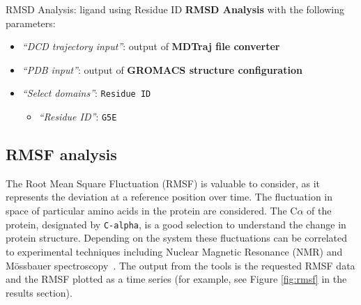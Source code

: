\documentclass[twocolumn]{bmcart}%
\providecommand{\tightlist}{%
  \setlength{\itemsep}{0pt}\setlength{\parskip}{0pt}}
\begin{document}

\begin{handson_box_colour}{RMSD Analysis: ligand using Residue ID}
  \textbf{RMSD Analysis} with the following parameters:

  \begin{itemize}
  \tightlist
  \item
    \emph{``DCD trajectory input''}: output of
    \textbf{MDTraj file converter}
  \item
    \emph{``PDB input''}:
    output of \textbf{GROMACS
    structure configuration}
  \item
    \emph{``Select domains''}: \texttt{Residue\ ID}

    \begin{itemize}
    \tightlist
    \item
      \emph{``Residue ID''}: \texttt{G5E}
    \end{itemize}
  \end{itemize}



\end{handson_box_colour}



\hypertarget{rmsf-analysis}{%
\subsection*{RMSF analysis}\label{rmsf-analysis}}

The Root Mean Square Fluctuation (RMSF) is valuable to consider, as it represents the deviation at a reference position over time. The fluctuation in space of particular amino acids in the protein are considered. The C$\alpha$ of the protein, designated by \texttt{C-alpha}, is a good selection to understand the change in protein structure. Depending on the system these fluctuations can be correlated to experimental techniques including Nuclear Magnetic Resonance (NMR) and M\"{o}ssbauer spectroscopy~\cite{berjanskii_nmr_2006,kuzmanic_determination_2010}. The output from the tools is the requested RMSF data and the RMSF plotted as a time series (for example, see Figure \ref{fig:rmsf} in the results section).
\end{document}
